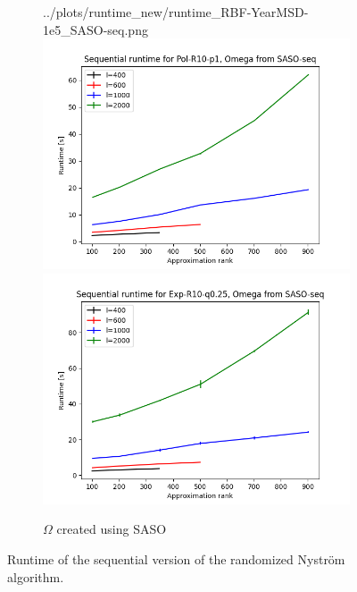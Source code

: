 \documentclass{article}
\theoremstyle{definition}
\begin{document}
\begin{figure}
\begin{subfigure}[t]{0.4\textwidth}
        {../plots/runtime_new/runtime_RBF-YearMSD-1e5_SASO-seq.png}
    \includegraphics[width=\textwidth]
        {../plots/runtime_new/runtime_Pol-R10-p1_SASO-seq.png}
    \includegraphics[width=\textwidth]
        {../plots/runtime_new/runtime_Exp-R10-q0.25_SASO-seq.png}
    \caption{$\Omega$ created using SASO}
\end{subfigure}\hfill
\caption{Runtime of the sequential version of the randomized Nyström algorithm.}
\label{fig:SequentialRuntime}
\end{figure}
\end{document}
